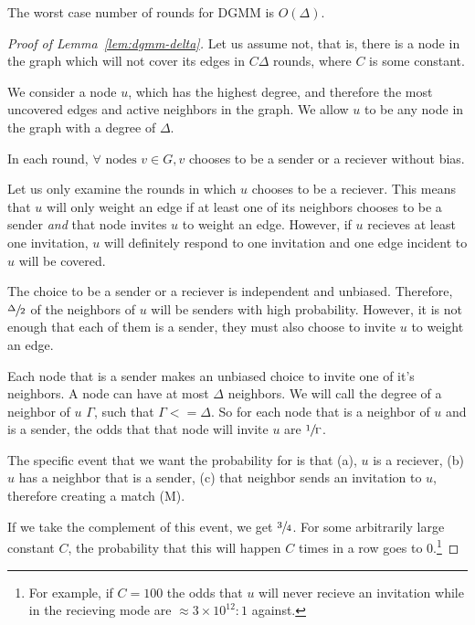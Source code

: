 \begin{lem}
  \label{lem:dgmm-delta}
  The worst case number of rounds for DGMM is $O(\Delta)$.
\end{lem}


\begin{proof}[Proof of Lemma~\ref{lem:dgmm-delta}]
Let us assume not, that is, there is a node in the graph which will not cover its edges in $C\Delta$ rounds, where $C$ is some constant.

We consider a node $u$, which has the highest degree, and therefore the most uncovered edges and active neighbors in the graph. We allow $u$ to be any node in the graph with a degree of $\Delta$.

In each round, $\forall \text{ nodes } v \in G, v$ chooses to be a sender or a reciever without bias. 

Let us only examine the rounds in which $u$ chooses to be a reciever. This means that $u$ will only weight an edge if at least one of its neighbors chooses to be a sender {\em and} that node invites $u$ to weight an edge. However, if $u$ recieves at least one invitation, $u$ will definitely respond to one invitation and one edge incident to $u$ will be covered.

The choice to be a sender or a reciever is independent and unbiased. Therefore, $\sfrac{\Delta}{2}$ of the neighbors of $u$ will be senders with high probability. However, it is not enough that each of them is a sender, they must also choose to invite $u$ to weight an edge.

Each node that is a sender makes an unbiased choice to invite one of it's neighbors. A node can have at most $\Delta$ neighbors. We will call the degree of a neighbor of $u$ $\Gamma$, such that $\Gamma <= \Delta$. So for each node that is a neighbor of $u$ and is a sender, the odds that that node will invite $u$ are $\sfrac{1}{\Gamma}$.

The specific event that we want the probability for is that (a), $u$ is a reciever, (b) $u$ has a neighbor that is a sender, (c) that neighbor sends an invitation to $u$, therefore creating a match (M).



If we take the complement of this event, we get $\sfrac{3}{4}$. For some arbitrarily large constant $C$, the probability that this will happen $C$ times in a row goes to 0.\footnote{For example, if $C = 100$ the odds that $u$ will never recieve an invitation while in the recieving mode are $\approx 3\times10^{12}:1$ against.} 


\end{proof}
